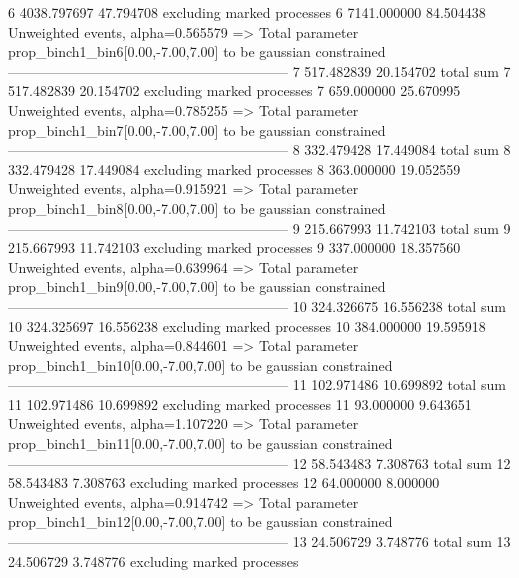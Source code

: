 6          4038.797697     47.794708       excluding marked processes    
6          7141.000000     84.504438       Unweighted events, alpha=0.565579
  => Total parameter prop_binch1_bin6[0.00,-7.00,7.00] to be gaussian constrained
------------------------------------------------------------
7          517.482839      20.154702       total sum                     
7          517.482839      20.154702       excluding marked processes    
7          659.000000      25.670995       Unweighted events, alpha=0.785255
  => Total parameter prop_binch1_bin7[0.00,-7.00,7.00] to be gaussian constrained
------------------------------------------------------------
8          332.479428      17.449084       total sum                     
8          332.479428      17.449084       excluding marked processes    
8          363.000000      19.052559       Unweighted events, alpha=0.915921
  => Total parameter prop_binch1_bin8[0.00,-7.00,7.00] to be gaussian constrained
------------------------------------------------------------
9          215.667993      11.742103       total sum                     
9          215.667993      11.742103       excluding marked processes    
9          337.000000      18.357560       Unweighted events, alpha=0.639964
  => Total parameter prop_binch1_bin9[0.00,-7.00,7.00] to be gaussian constrained
------------------------------------------------------------
10         324.326675      16.556238       total sum                     
10         324.325697      16.556238       excluding marked processes    
10         384.000000      19.595918       Unweighted events, alpha=0.844601
  => Total parameter prop_binch1_bin10[0.00,-7.00,7.00] to be gaussian constrained
------------------------------------------------------------
11         102.971486      10.699892       total sum                     
11         102.971486      10.699892       excluding marked processes    
11         93.000000       9.643651        Unweighted events, alpha=1.107220
  => Total parameter prop_binch1_bin11[0.00,-7.00,7.00] to be gaussian constrained
------------------------------------------------------------
12         58.543483       7.308763        total sum                     
12         58.543483       7.308763        excluding marked processes    
12         64.000000       8.000000        Unweighted events, alpha=0.914742
  => Total parameter prop_binch1_bin12[0.00,-7.00,7.00] to be gaussian constrained
------------------------------------------------------------
13         24.506729       3.748776        total sum                     
13         24.506729       3.748776        excluding marked processes    
